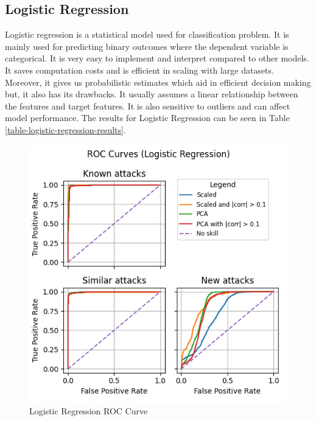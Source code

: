 \subsection{Logistic Regression}
Logistic regression is a statistical model used for classification problem. It is mainly used for predicting binary outcomes where the dependent variable is categorical. It is very easy to implement and interpret compared to other models. It saves computation costs and is efficient in scaling with large datasets. Moreover, it gives us probabilistic estimates which aid in efficient decision making but, it also has its drawbacks. It usually assumes a linear relationship between the features and target features. It is also sensitive to outliers and can affect model performance.
The results for Logistic Regression can be seen in Table \ref{table-logistic-regression-results}.
\begin{figure}
    \centering
    \includegraphics[width=\linewidth]{figures/Logistic Regression_roc_all_small.png}
    \caption{Logistic Regression ROC Curve}
    \label{fig:logreg_roc}
\end{figure}





